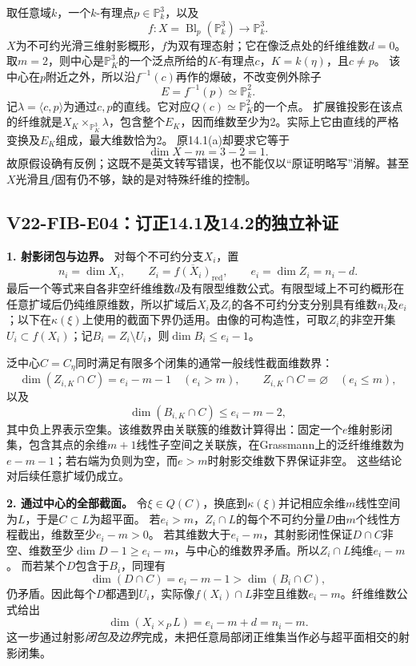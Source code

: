 \documentclass[UTF8,a4paper]{ctexbook}
\begin{document}
取任意域$k$，一个$k$-有理点$p\in\mathbb P^3_k$，以及
\[
f:X=\operatorname{Bl}_p(\mathbb P^3_k)\longrightarrow\mathbb P^3_k.
\]
$X$为不可约光滑三维射影概形，$f$为双有理态射；它在像泛点处的纤维维数$d=0$。取$m=2$，则中心是$\mathbb P^3_K$的一个泛点所给的$K$-有理点$c$，$K=k(\eta)$，且$c\ne p$。
该中心在$p$附近之外，所以沿$f^{-1}(c)$再作的爆破，不改变例外除子
\[
E=f^{-1}(p)\simeq\mathbb P^2_k.
\]
记$\lambda=\langle c,p\rangle$为通过$c,p$的直线。它对应$Q(c)\simeq\mathbb P^2_K$的一个点。
扩展锥投影在该点的纤维就是$X_K\times_{\mathbb P^3_K}\lambda$，包含整个$E_K$，因而维数至少为2。实际上它由直线的严格变换及$E_K$组成，最大维数恰为2。
原14.1(a)却要求它等于
\[
\dim X-m=3-2=1.
\]
故原假设确有反例；这既不是英文转写错误，也不能仅以“原证明略写”消解。甚至$X$光滑且$f$固有仍不够，缺的是对特殊纤维的控制。

\subsection*{V22-FIB-E04：订正14.1及14.2的独立补证}

\noindent\textbf{1. 射影闭包与边界。}
对每个不可约分支$X_i$，置
\[
n_i=\dim X_i,\qquad Z_i=\overline{f(X_i)}_{\mathrm{red}},
\qquad e_i=\dim Z_i=n_i-d.
\]
最后一个等式来自各非空纤维维数$d$及有限型维数公式。有限型域上不可约概形在任意扩域后仍纯维原维数，所以扩域后$X_i$及$Z_i$的各不可约分支分别具有维数$n_i$及$e_i$；以下在$\kappa(\xi)$上使用的截面下界仍适用。由像的可构造性，可取$Z_i$的非空开集$U_i\subset f(X_i)$；记$B_i=Z_i\setminus U_i$，则$\dim B_i\leq e_i-1$。

泛中心$C=C_\eta$同时满足有限多个闭集的通常一般线性截面维数界：
\[
\dim(Z_{i,K}\cap C)=e_i-m-1\quad(e_i>m),\qquad
Z_{i,K}\cap C=\varnothing\quad(e_i\leq m),
\]
以及
\[
\dim(B_{i,K}\cap C)\leq e_i-m-2,
\]
其中负上界表示空集。该维数界由关联簇的维数计算得出：固定一个$e$维射影闭集，包含其点的余维$m+1$线性子空间之关联族，在Grassmann上的泛纤维维数为$e-m-1$；若右端为负则为空，而$e>m$时射影交维数下界保证非空。
这些结论对后续任意扩域仍成立。

\noindent\textbf{2. 通过中心的全部截面。}
令$\xi\in Q(C)$，换底到$\kappa(\xi)$并记相应余维$m$线性空间为$L$，于是$C\subset L$为超平面。
若$e_i>m$，$Z_i\cap L$的每个不可约分量$D$由$m$个线性方程截出，维数至少$e_i-m>0$。
若其维数大于$e_i-m$，其射影闭性保证$D\cap C$非空、维数至少$\dim D-1\geq e_i-m$，与中心的维数界矛盾。所以$Z_i\cap L$纯维$e_i-m$。
而若某个$D$包含于$B_i$，同理有
\[
\dim(D\cap C)=e_i-m-1>\dim(B_i\cap C),
\]
仍矛盾。因此每个$D$都遇到$U_i$，实际像$f(X_i)\cap L$非空且维数$e_i-m$。纤维维数公式给出
\[
\dim(X_i\times_P L)=e_i-m+d=n_i-m.
\tag{V22-FIB.2}
\]
这一步通过射影\emph{闭包及边界}完成，未把任意局部闭正维集当作必与超平面相交的射影闭集。
\end{document}
